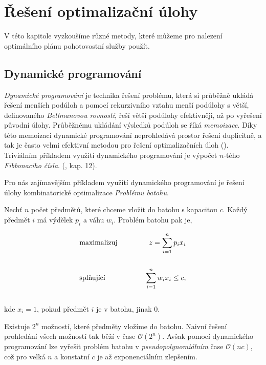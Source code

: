 \chapter{Řešení optimalizační úlohy}\label{chap:reseniOptUloh}

V této kapitole vyzkoušíme různé metody, které můžeme pro nalezení optimálního plánu pohotovostní služby použít.

\section{Dynamické programování}\label{kap:dynamicProgram}

\textit{Dynamické programování} je technika řešení problému, která si průběžně ukládá řešení menších podúloh a pomocí rekurzivního vztahu menší podúlohy s větší,
definovaného \textit{Bellmanovou rovností}, řeší větší podúlohy efektivněji, až po vyřešení původní úlohy. 
Průběžnému ukládání výsledků podúloh se říká \textit{memoizace}.
Díky této memoizaci dynamické programování neprohledává prostor řešení duplicitně, a tak je často velmi efektivní metodou pro řešení optimalizačních úloh (\citet{dynamic}).
Triviálním příkladem využití dynamického programování je výpočet $n$-tého \textit{Fibbonaciho čísla}. (\citet{mares}, kap. 12).

Pro nás zajímavějším příkladem využití dynamického programování je řešení úlohy kombinatorické optimalizace \textit{Problému batohu}.

\begin{definice}
  Nechť $n$ počet předmětů, které chceme vložit do batohu s kapacitou $c$.
  Každý předmět $i$ má výdělek $p_i$ a váhu $w_i$. Problém batohu pak je,

  \begin{alignat*}{2}
    &\normalfont \text{maximalizuj} \hspace{30pt} &z = \sum_{i=1}^n p_i x_i \\
    \\
    &\normalfont \text{splňující} \hspace{30pt} &\sum_{i = 1}^{n} w_i x_i \leq c,
  \end{alignat*}
  \\
  kde $x_i = 1$, pokud předmět $i$ je v batohu, jinak $0$.
  \\
\end{definice}

Existuje $2^n$ možností, které předměty vložíme do batohu. Naivní řešení prohledání všech možností tak běží v čase $\mathcal{O} (2^n)$.
Avšak pomocí dynamického programování lze vyřešit problém batohu v \textit{pseudopolynomiálním} čase $\mathcal{O}(nc)$,
což pro velká $n$ a konstatní $c$ je až exponenciálním zlepšením.

